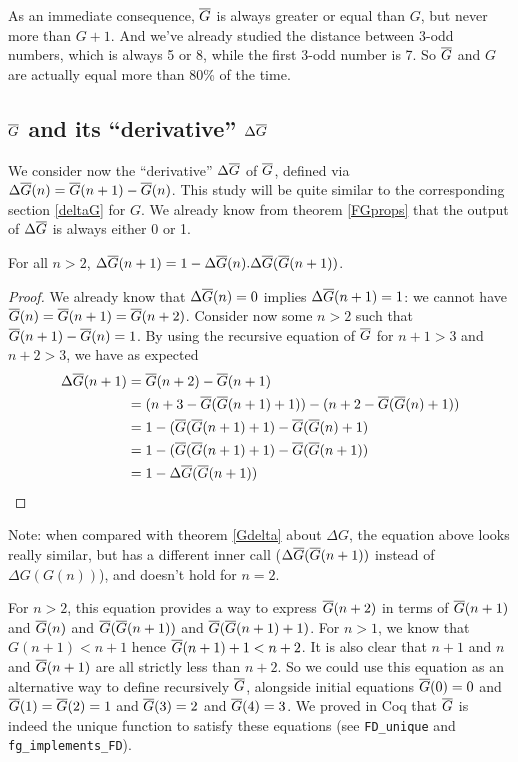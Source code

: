 \documentclass[a4paper,11pt]{article}
\begin{document}
As an immediate consequence, $\overline{G}$ is always greater or equal
than $G$, but never more than $G+1$. And we've already studied
the distance between 3-odd numbers, which is always 5 or 8,
while the first 3-odd number is 7. So $\overline{G}$ and $G$ are actually
equal more than 80\% of the time.

\subsection{$\overline{G}$ and its ``derivative'' $\Delta\overline{G}$}

We consider now the ``derivative'' $\Delta\overline{G}$ of $\overline{G}$, defined via
$\Delta \overline{G}(n) = \overline{G}(n+1)-\overline{G}(n)$. This study will be quite
similar to the corresponding section \ref{deltaG} for $G$.
We already know from theorem
\ref{FGprops} that the output of $\Delta\overline{G}$ is always either 0 or 1.

\begin{theorem}\label{FGdelta}
  For all $n>2$, $\Delta\overline{G}(n+1) = 1 - \Delta\overline{G}(n).\Delta\overline{G}(\overline{G}(n+1))$.
\end{theorem}
\begin{proof}
We already know that $\Delta\overline{G}(n)=0$ implies $\Delta\overline{G}(n+1)=1$:
we cannot have $\overline{G}(n)=\overline{G}(n+1)=\overline{G}(n+2)$.
Consider now some $n>2$ such that
$\overline{G}(n+1)-\overline{G}(n)=1$. By using the recursive equation of $\overline{G}$
for $n+1>3$ and $n+2>3$, we have as expected
\begin{align*}
 \Delta\overline{G}(n+1) & = \overline{G}(n+2)-\overline{G}(n+1) \\
                & =(n+3-\overline{G}(\overline{G}(n+1)+1))-(n+2-\overline{G}(\overline{G}(n)+1)) \\
                & = 1 - (\overline{G}(\overline{G}(n+1)+1)-\overline{G}(\overline{G}(n)+1) \\
                & = 1 - (\overline{G}(\overline{G}(n+1)+1)-\overline{G}(\overline{G}(n+1)) \\
                & = 1 - \Delta\overline{G}(\overline{G}(n+1))
\end{align*}
\end{proof}

Note: when compared with theorem \ref{Gdelta} about $\Delta G$, 
the equation
above looks really similar, but has a different inner call
($\Delta\overline{G}(\overline{G}(n+1))$ instead of $\Delta G(G(n))$), and doesn't
hold for $n=2$.

For $n>2$, this equation provides a way to express $\overline{G}(n+2)$ in terms of
$\overline{G}(n+1)$ and $\overline{G}(n)$ and $\overline{G}(\overline{G}(n+1))$ and $\overline{G}(\overline{G}(n+1)+1)$.
For $n>1$, we know that $G(n+1)<n+1$ hence $\overline{G}(n+1)+1<n+2$.
It is also clear that $n+1$ and $n$ and $\overline{G}(n+1)$ are all
strictly less than $n+2$.
So we could use this equation as an alternative way to define
recursively $\overline{G}$,
alongside  initial equations $\overline{G}(0)=0$ and $\overline{G}(1)=\overline{G}(2)=1$ and
$\overline{G}(3)=2$ and $\overline{G}(4)=3$.
We proved in Coq that $\overline{G}$ is indeed the unique function to
satisfy these equations (see {\tt FD\_unique} and
{\tt  fg\_implements\_FD}).
\end{document}

